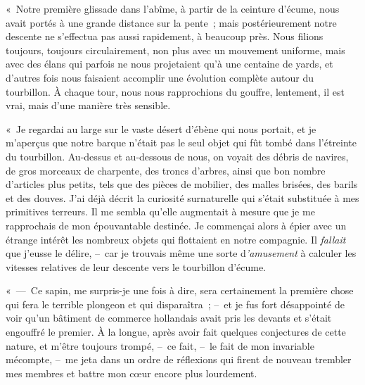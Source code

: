 \documentclass[french,twoside]{book} %
\begin{document}
« Notre première glissade dans l’abîme, à partir de la ceinture d’écume, nous avait portés à une grande distance sur la pente ; mais postérieurement notre descente ne s’effectua pas aussi rapidement, à beaucoup près. Nous filions toujours, toujours circulairement, non plus avec un mouvement uniforme, mais avec des élans qui parfois ne nous projetaient qu’à une centaine de yards, et d’autres fois nous faisaient accomplir une évolution complète autour du tourbillon. À chaque tour, nous nous rapprochions du gouffre, lentement, il est vrai, mais d’une manière très sensible.\par
« Je regardai au large sur le vaste désert d’ébène qui nous portait, et je m’aperçus que notre barque n’était pas le seul objet qui fût tombé dans l’étreinte du tourbillon. Au-dessus et au-dessous de nous, on voyait des débris de navires, de gros morceaux de charpente, des troncs d’arbres, ainsi que bon nombre d’articles plus petits, tels que des pièces de mobilier, des malles brisées, des barils et des douves. J’ai déjà décrit la curiosité surnaturelle qui s’était substituée à mes primitives terreurs. Il me sembla qu’elle augmentait à mesure que je me rapprochais de mon épouvantable destinée. Je commençai alors à épier avec un étrange intérêt les nombreux objets qui flottaient en notre compagnie. Il \emph{fallait} que j’eusse le délire, – car je trouvais même une sorte d\emph{’amusement} à calculer les vitesses relatives de leur descente vers le tourbillon d’écume.\par
« — Ce sapin, me surpris-je une fois à dire, sera certainement la première chose qui fera le terrible plongeon et qui disparaîtra ; – et je fus fort désappointé de voir qu’un bâtiment de commerce hollandais avait pris les devants et s’était engouffré le premier. À la longue, après avoir fait quelques conjectures de cette nature, et m’être toujours trompé, – ce fait, – le fait de mon invariable mécompte, – me jeta dans un ordre de réflexions qui firent de nouveau trembler mes membres et battre mon cœur encore plus lourdement.\par
\end{document}
